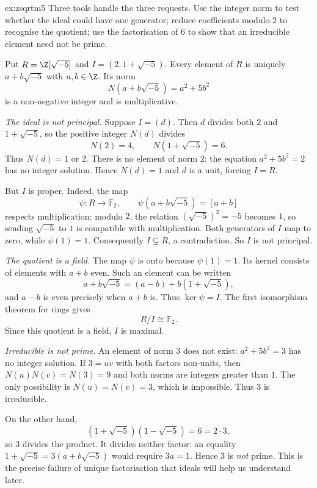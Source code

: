 \begin{solution}{ex:zsqrtm5}
\idea Three tools handle the three requests. Use the integer norm to test whether the ideal could have one generator; reduce coefficients modulo $2$ to recognise the quotient; use the factorisation of $6$ to show that an irreducible element need not be prime.

\writeup Put $R=\Z[\sqrt{-5}]$ and $I=(2,1+\sqrt{-5})$. Every element of $R$ is uniquely $a+b\sqrt{-5}$ with $a,b\in\Z$. Its norm
\[
N(a+b\sqrt{-5})=a^2+5b^2
\]
is a non-negative integer and is multiplicative.

\emph{The ideal is not principal.} Suppose $I=(d)$. Then $d$ divides both $2$ and $1+\sqrt{-5}$, so the positive integer $N(d)$ divides
\[
N(2)=4,\qquad N(1+\sqrt{-5})=6.
\]
Thus $N(d)=1$ or $2$. There is no element of norm $2$: the equation $a^2+5b^2=2$ has no integer solution. Hence $N(d)=1$ and $d$ is a unit, forcing $I=R$.

But $I$ is proper. Indeed, the map
\[
\psi:R\to\mathbb F_2,\qquad
\psi(a+b\sqrt{-5})=[a+b]
\]
respects multiplication: modulo $2$, the relation $(\sqrt{-5})^2=-5$ becomes $1$, so sending $\sqrt{-5}$ to $1$ is compatible with multiplication. Both generators of $I$ map to zero, while $\psi(1)=1$. Consequently $I\subsetneq R$, a contradiction. So $I$ is not principal.

\emph{The quotient is a field.} The map $\psi$ is onto because $\psi(1)=1$. Its kernel consists of elements with $a+b$ even. Such an element can be written
\[
a+b\sqrt{-5}=(a-b)+b(1+\sqrt{-5}),
\]
and $a-b$ is even precisely when $a+b$ is. Thus $\ker\psi=I$. The first isomorphism theorem for rings gives
\[
R/I\cong\mathbb F_2.
\]
Since this quotient is a field, $I$ is maximal.

\emph{Irreducible is not prime.} An element of norm $3$ does not exist: $a^2+5b^2=3$ has no integer solution. If $3=uv$ with both factors non-units, then $N(u)N(v)=N(3)=9$ and both norms are integers greater than $1$. The only possibility is $N(u)=N(v)=3$, which is impossible. Thus $3$ is irreducible.

On the other hand,
\[
(1+\sqrt{-5})(1-\sqrt{-5})=6=2\cdot3,
\]
so $3$ divides the product. It divides neither factor: an equality $1\pm\sqrt{-5}=3(a+b\sqrt{-5})$ would require $3a=1$. Hence $3$ is \emph{not} prime. This is the precise failure of unique factorisation that ideals will help us understand later.
\end{solution}

